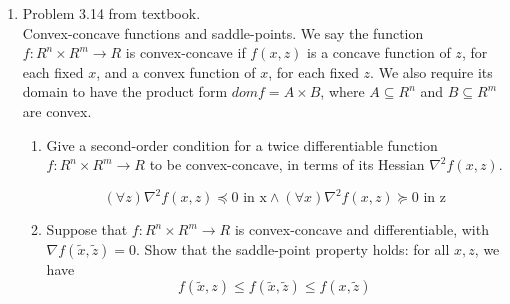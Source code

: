 \documentclass[12pt,letter]{article}
\begin{document}
\begin{enumerate}
  \pagebreak
  
\item Problem 3.14 from textbook.\\
  Convex-concave functions and saddle-points. We say the function $f: R^n \times R^m \to R$ is convex-concave if $f(x, z)$ is a concave function of $z$, for each fixed $x$, and a convex function of $x$, for each fixed $z$. We also require its domain to have the product form $dom f = A \times B$, where $A \subseteq R^n$ and $B \subseteq R^m$ are convex.\\
  \begin{enumerate}
  \item Give a second-order condition for a twice differentiable function $f : R^n \times R^m \to R$ to be convex-concave, in terms of its Hessian $\nabla^2 f(x, z)$.

    \[ (\forall z) \nabla^2 f(x,z) \preceq 0 \text{ in x} \wedge (\forall x) \nabla^2 f(x,z) \succeq 0 \text{ in z} \]
    
  \item Suppose that $f: R^n \times R^m \to R$ is convex-concave and differentiable, with $\nabla f(\tilde{x}, \tilde{z}) = 0$. Show that the saddle-point property holds: for all $x, z$, we have \[f(\tilde{x}, z) \leq f(\tilde{x}, \tilde{z}) \leq f(x, \tilde{z})\]


\end{enumerate}
\end{enumerate}
\end{document}
